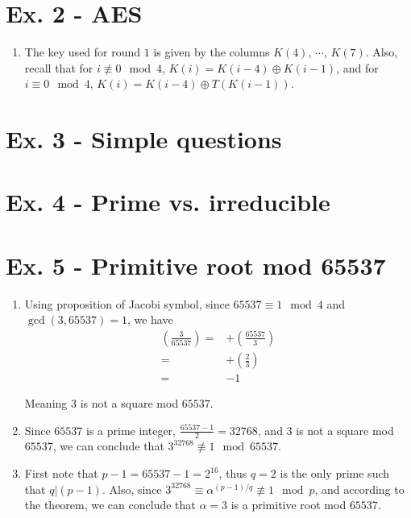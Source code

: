 \documentclass[11pt,a4paper]{article}
\begin{document}
\newpage
\section*{Ex. 2 - AES}
\begin{enumerate}
\item The key used for round $1$ is given by the columns $K(4)$, $\cdots$, $K(7)$. Also, recall that for $i \not\equiv 0 \mod 4$, $K(i) = K(i-4) \oplus K(i-1)$, and for $i \equiv 0 \mod 4$, $K(i) = K(i-4) \oplus T(K(i-1))$.
\end{enumerate}


\section*{Ex. 3 - Simple questions}


\section*{Ex. 4 - Prime vs. irreducible}


\section*{Ex. 5 - Primitive root mod 65537}
\begin{enumerate}
\item Using proposition of Jacobi symbol, since $65537 \equiv 1 \mod 4$ and $\gcd(3, 65537) = 1$, we have
\begin{align*}
	\left(\frac{3}{65537}\right) =& +\left(\frac{65537}{3}\right) \\
	=& +\left(\frac{2}{3}\right) \\
	=& -1
\end{align*}
\par Meaning $3$ is not a square mod $65537$.

\item Since $65537$ is a prime integer, $\frac{65537-1}{2} = 32768$, and $3$ is not a square mod $65537$, we can conclude that $3^{32768}\not\equiv 1 \mod 65537$.

\item First note that $p-1=65537-1 = 2^{16}$, thus $q=2$ is the only prime such that $q \vert (p-1)$. Also, since $3^{32768}\equiv \alpha^{(p-1)/q} \not\equiv 1 \mod p$, and according to the theorem, we can conclude that $\alpha = 3$ is a primitive root mod $65537$.
\end{enumerate}
\end{document}
